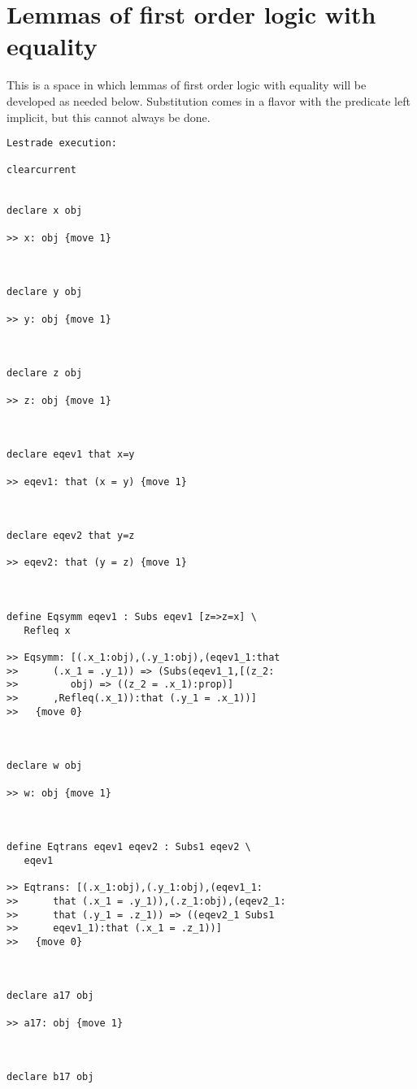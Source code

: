 \documentclass[12pt]{article}
\begin{document}
\section{Lemmas of first order logic with equality}

This is a space in which lemmas of first order logic with equality will be developed as needed below.  Substitution comes in a flavor with the predicate left implicit, but this cannot always be done.

\begin{verbatim}Lestrade execution:

clearcurrent


declare x obj

>> x: obj {move 1}



declare y obj

>> y: obj {move 1}



declare z obj

>> z: obj {move 1}



declare eqev1 that x=y

>> eqev1: that (x = y) {move 1}



declare eqev2 that y=z

>> eqev2: that (y = z) {move 1}



define Eqsymm eqev1 : Subs eqev1 [z=>z=x] \
   Refleq x

>> Eqsymm: [(.x_1:obj),(.y_1:obj),(eqev1_1:that
>>      (.x_1 = .y_1)) => (Subs(eqev1_1,[(z_2:
>>         obj) => ((z_2 = .x_1):prop)]
>>      ,Refleq(.x_1)):that (.y_1 = .x_1))]
>>   {move 0}



declare w obj

>> w: obj {move 1}



define Eqtrans eqev1 eqev2 : Subs1 eqev2 \
   eqev1

>> Eqtrans: [(.x_1:obj),(.y_1:obj),(eqev1_1:
>>      that (.x_1 = .y_1)),(.z_1:obj),(eqev2_1:
>>      that (.y_1 = .z_1)) => ((eqev2_1 Subs1
>>      eqev1_1):that (.x_1 = .z_1))]
>>   {move 0}



declare a17 obj

>> a17: obj {move 1}



declare b17 obj


\end{verbatim}
\end{document}
